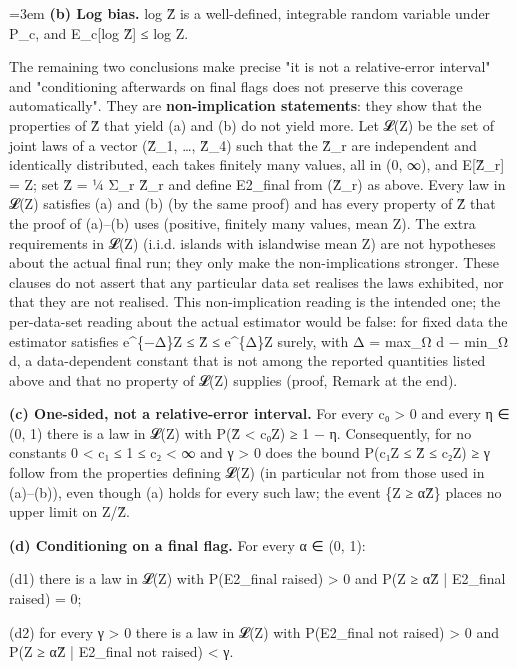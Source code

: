 \documentclass[11pt]{report}
\newenvironment{mdblock}{\begingroup\mdfont\raggedright\setlength{\parindent}{0pt}\setlength{\parskip}{0.55em}\emergencystretch=3em}{\par\endgroup}
\begin{document}
\begin{mdblock}
\textbf{(b) Log bias.} log Ẑ is a well-defined, integrable random variable under P\_c, and E\_c[log Ẑ] ≤ log Z.

The remaining two conclusions make precise "it is not a relative-error interval" and "conditioning afterwards on final flags does not preserve this coverage automatically". They are \textbf{non-implication statements}: they show that the properties of Ẑ that yield (a) and (b) do not yield more. Let 𝓛(Z) be the set of joint laws of a vector (Ẑ\_1, …, Ẑ\_4) such that the Ẑ\_r are independent and identically distributed, each takes finitely many values, all in (0, ∞), and E[Ẑ\_r] = Z; set Ẑ = ¼ Σ\_r Ẑ\_r and define E2\_final from (Ẑ\_r) as above. Every law in 𝓛(Z) satisfies (a) and (b) (by the same proof) and has every property of Ẑ that the proof of (a)–(b) uses (positive, finitely many values, mean Z). The extra requirements in 𝓛(Z) (i.i.d. islands with islandwise mean Z) are not hypotheses about the actual final run; they only make the non-implications stronger. These clauses do not assert that any particular data set realises the laws exhibited, nor that they are not realised. This non-implication reading is the intended one; the per-data-set reading about the actual estimator would be false: for fixed data the estimator satisfies e\textasciicircum{}\{−Δ\}Z ≤ Ẑ ≤ e\textasciicircum{}\{Δ\}Z surely, with Δ = max\_Ω d − min\_Ω d, a data-dependent constant that is not among the reported quantities listed above and that no property of 𝓛(Z) supplies (proof, Remark at the end).

\textbf{(c) One-sided, not a relative-error interval.} For every c₀ > 0 and every η ∈ (0, 1) there is a law in 𝓛(Z) with P(Ẑ < c₀Z) ≥ 1 − η. Consequently, for no constants 0 < c₁ ≤ 1 ≤ c₂ < ∞ and γ > 0 does the bound P(c₁Z ≤ Ẑ ≤ c₂Z) ≥ γ follow from the properties defining 𝓛(Z) (in particular not from those used in (a)–(b)), even though (a) holds for every such law; the event \{Z ≥ αẐ\} places no upper limit on Z/Ẑ.

\textbf{(d) Conditioning on a final flag.} For every α ∈ (0, 1):

\begin{mdbul}
\item (d1) there is a law in 𝓛(Z) with P(E2\_final raised) > 0 and P(Z ≥ αẐ | E2\_final raised) = 0;
\item (d2) for every γ > 0 there is a law in 𝓛(Z) with P(E2\_final not raised) > 0 and P(Z ≥ αẐ | E2\_final not raised) < γ.
\end{mdbul}


\end{mdblock}
\end{document}
